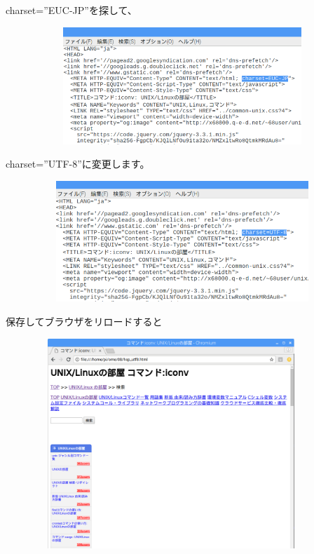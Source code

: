 \documentclass[a4paper,12pt,dvipdfmx]{jarticle}
\begin{document}
charset=”EUC-JP”を探して、



\begin{center}
\includegraphics[width=17.006cm,height=4.417cm]{textbook-img025.png}

\end{center}
charset=”UTF-8”に変更します。



\begin{center}
\includegraphics[width=17.006cm,height=4.567cm]{textbook-img026.png}

\end{center}
保存してブラウザをリロードすると



\begin{center}
\includegraphics[width=12.495cm,height=7.932cm]{textbook-img027.png}

\end{center}
\end{document}

